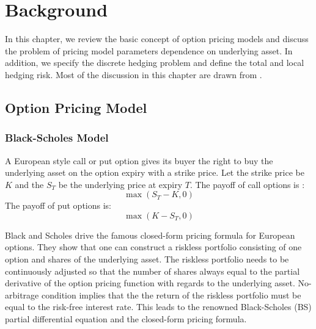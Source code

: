 \documentclass[letterpaper,12pt,titlepage,oneside,final]{book}
\numberwithin{equation}{section}
\theoremstyle{definition}
\begin{document}
\chapter{Background}
\label{sec:Background} 
In this chapter, we review the basic concept of option pricing models and discuss the problem of pricing model parameters dependence on underlying asset.  In addition, we specify the discrete hedging problem and define the total and local hedging risk. Most of the discussion in this chapter are drawn from \cite{shreve2004stochastic,heston1993closed,bartlett2006hedging,hagan2017bartlett,hagan2002managing}.
\section{Option Pricing Model}
\label{sec:pricing}
\subsection{Black-Scholes Model}
\label{sec:bs}
A European style call or put option gives its buyer the right to buy the underlying asset on the option expiry with a strike price. Let the strike price be $K$ and  the $S_T$ be the underlying price at expiry $T$. The payoff of call options is :
\[
\max(S_T-K,0)
\]
The payoff of put options is:
\[
\max(K-S_T,0)
\]

Black and Scholes \cite{black1973pricing} drive the famous closed-form pricing formula for European options. They show that one can construct a riskless portfolio consisting of one option and shares of the underlying asset. The riskless portfolio needs to be continuously adjusted so that the number of shares always equal to the partial derivative of the option pricing function with regards to the underlying asset. No-arbitrage condition implies that the the return of the riskless portfolio must be equal to the risk-free interest rate. This leads to the renowned Black-Scholes (BS) partial differential equation and the closed-form pricing formula.
\end{document}

